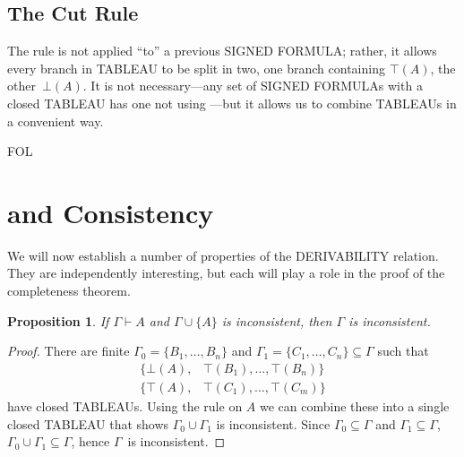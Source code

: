 \documentclass[10pt,a4paper]{article}
\newcommand*{\olup}[1]{\MakeUppercase{#1}}
\theoremstyle{plain}
\newtheorem{prop}[thm]{Proposition}
\theoremstyle{definition}
\theoremstyle{remark}
\newcommand*{\olfileid}[3]{}
\newcommand*{\olsection}[1]{\section*{#1}}
\newcommand*{\ollabel}[1]{\label{#1}}
\providecommand{\AxiomC}[1]{}
\providecommand{\UnaryInfC}[1]{}
\providecommand{\RightLabel}[1]{}
\providecommand{\noLine}{}
\providecommand{\DisplayProof}{}
\providecommand{\lif}{\mathbin{\rightarrow}}
\providecommand{\Proves}{\mathrel{\vdash}}
\providecommand{\sFmla}[2]{#1(#2)}
\providecommand{\True}{\top}
\providecommand{\False}{\bot}
\providecommand{\iftag}[1]{#1}
\providecommand{\TRule}[1]{}
\providecommand{\Cut}{\mathrm{Cut}}
\providecommand{\iftag}{}
\begin{document}
\begin{defish}
\AxiomC{\sFmla{\True}{A \lif B}}
\RightLabel{\TRule{\True}{\lif}}
\UnaryInfC{$\sFmla{\False}{A} \quad \mid \quad \sFmla{\True}{B}$}
\DisplayProof
\hfill
\AxiomC{\sFmla{\False}{A \lif B}}
\RightLabel{\TRule{\False}{\lif}}
\UnaryInfC{\sFmla{\True}{A}}
\noLine
\UnaryInfC{\sFmla{\False}{B}}
\DisplayProof
\end{defish}

\subsection{The Cut Rule}

\begin{defish}
\AxiomC{}
\RightLabel{\Cut}
\UnaryInfC{$\sFmla{\True}{A} \quad \mid \quad \sFmla{\False}{A}$}
\DisplayProof
\end{defish}

The \Cut{} rule is not applied ``to'' a previous \olup{signed formula}; rather,
it allows every branch in \olup{tableau} to be split in two, one branch
containing $\sFmla{\True}{A}$, the other~$\sFmla{\False}{A}$. It is
not necessary---any set of \olup{signed formula}s with a closed
\olup{tableau} has one not using \Cut---but it allows us to combine
\olup{tableau}s in a convenient way.





\iftag{FOL}
      {\olfileid{fol}{tab}{prv}}
      {\olfileid{pl}{tab}{prv}}

\olsection{ and Consistency}

We will now establish a number of properties of the \olup{derivability}
relation.  They are independently interesting, but each will play a
role in the proof of the completeness theorem.

\begin{prop}\ollabel{prop:provability-contr}
  If $\Gamma \Proves A$ and $\Gamma \cup \{A\}$ is
  inconsistent, then $\Gamma$ is inconsistent.
\end{prop}

\begin{proof}
There are finite $\Gamma_0 = \{B_1, \dots, B_n\}$ and $\Gamma_1
  =\{C_1, \dots, C_n\} \subseteq \Gamma$ such that
  \begin{align*}
    \{\sFmla{\False}{A}, &
    \sFmla{\True}{B_1}, \dots, \sFmla{\True}{B_n}\} \\
    \{\sFmla{\True}{A}, &
    \sFmla{\True}{C_1}, \dots, \sFmla{\True}{C_m}\}
  \end{align*}
  have closed \olup{tableau}s.  Using the \Cut{} rule on $A$ we can
  combine these into a single closed \olup{tableau} that shows $\Gamma_0
  \cup \Gamma_1$ is inconsistent.  Since $\Gamma_0
  \subseteq \Gamma$ and $\Gamma_1 \subseteq \Gamma$, $\Gamma_0 \cup
  \Gamma_1 \subseteq \Gamma$, hence $\Gamma$~is inconsistent.
\end{proof}
\end{document}
